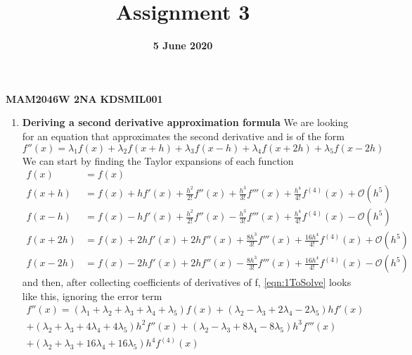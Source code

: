 \documentclass[12pt]{article}
\title{Assignment 3}
\date{\textbf{5 June 2020}}
\author{}
\begin{document}
    \maketitle
    \begin{center}
    \textbf{\large{MAM2046W 2NA}}
    \textbf{\large{KDSMIL001}}
    \end{center}
    \vspace*{15pt}
    
    \begin{enumerate}
        \item \textbf{Deriving a second derivative approximation formula} \newline
        We are looking for an equation that approximates the second derivative and is of the form 
        \begin{equation}
            f''(x) = \lambda_1f(x)+\lambda_2f(x+h)+\lambda_3f(x-h)+\lambda_4f(x+2h)+\lambda_5f(x-2h)
            \label{eqn:1ToSolve}
        \end{equation}
        We can start by finding the Taylor expansions of each function
        \begin{align*}
            f(x) &= f(x) \\
            f(x+h) &= f(x)+hf'(x)+\frac{h^2}{2!}f''(x)+\frac{h^3}{3!}f'''(x)+\frac{h^4}{4!}f^{(4)}(x)+\mathcal{O}(h^5) \\
            f(x-h) &= f(x)-hf'(x)+\frac{h^2}{2!}f''(x)-\frac{h^3}{3!}f'''(x)+\frac{h^4}{4!}f^{(4)}(x)-\mathcal{O}(h^5) \\
            f(x+2h) &= f(x)+2hf'(x)+2hf''(x)+\frac{8h^3}{3!}f'''(x)+\frac{16h^4}{4!}f^{(4)}(x)+\mathcal{O}(h^5) \\
            f(x-2h) &= f(x)-2hf'(x)+2hf''(x)-\frac{8h^3}{3!}f'''(x)+\frac{16h^4}{4!}f^{(4)}(x)-\mathcal{O}(h^5) 
        \end{align*}
        and then, after collecting coefficients of derivatives of f, \autoref{eqn:1ToSolve} looks like 
        this, ignoring the error term
        \begin{equation}
            \begin{gathered}
                f''(x)=(\lambda_1+\lambda_2+\lambda_3+\lambda_4+\lambda_5)f(x)+(\lambda_2-\lambda_3+2\lambda_4-2\lambda_5)hf'(x) \\
                +(\lambda_2+\lambda_3+4\lambda_4+4\lambda_5)h^2f''(x)+(\lambda_2-\lambda_3+8\lambda_4-8\lambda_5)h^3f'''(x) \\
                +(\lambda_2+\lambda_3+16\lambda_4+16\lambda_5)h^4f^{(4)}(x)
            \end{gathered}

\end{equation}
\end{enumerate}
\end{document}
